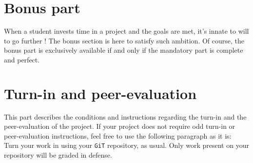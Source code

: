 \documentclass{42-en}
\begin{document}
\chapter{Bonus part}

    When a student invests time in a project and the goals are met,
    it's innate to will to go further ! The bonus section is here to satisfy
    such ambition. Of course, the bonus part is exclusively available
    if and only if the mandatory part is complete and perfect.



\chapter{Turn-in and peer-evaluation}

    This part describes the conditions and instructions regarding the turn-in and
    the peer-evaluation of the project. If your project does not
    require odd turn-in or peer-evaluation instructions, feel free to
    use the following paragraph as it is:\\

    Turn your work in using your \texttt{GiT} repository, as
    usual. Only work present on your repository will be graded in defense.



\end{document}
